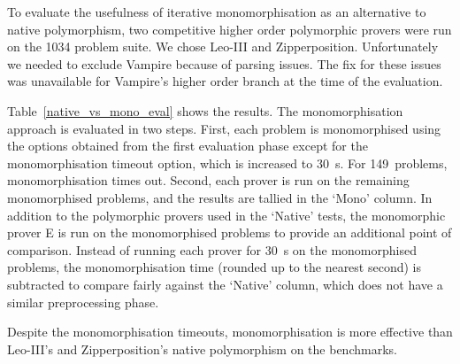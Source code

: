 \documentclass[runningheads]{llncs}
\begin{document}
To evaluate the usefulness of iterative monomorphisation as an alternative to native polymorphism, two competitive higher order polymorphic provers were run on the 1034 problem suite. We chose Leo-III and Zipperposition. Unfortunately we needed to exclude Vampire because of parsing issues.
The fix for these issues was unavailable for Vampire's higher order branch at the time of the evaluation.

Table~\ref{native_vs_mono_eval} shows the results.
The monomorphisation approach is evaluated in two steps. First, each problem is monomorphised using the options obtained from the first evaluation phase except for the monomorphisation timeout option, which is increased to 30~s. For 149~problems, monomorphisation times out. Second, each prover is run on the remaining monomorphised problems, and the results are tallied in the `Mono' column. In addition to the polymorphic provers used in the `Native' tests, the monomorphic prover E is run on the monomorphised problems to provide an additional point of comparison. Instead of running each prover for 30~s on the monomorphised problems, the monomorphisation time (rounded up to the nearest second) is subtracted to compare fairly against the `Native' column, which does not have a similar preprocessing phase.

Despite the monomorphisation timeouts, monomorphisation is more effective than Leo-III's and Zipperposition's native polymorphism on the benchmarks.


%
%
%    
\end{document}
